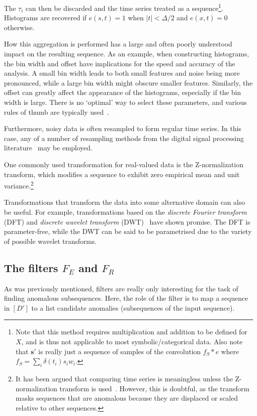 The $\tau_i$ can then be discarded and the time series treated as a sequence\footnote{Note that this method requires multiplication and addition to be defined for $X$, and is thus not applicable to most symbolic/categorical data. Also note that $\mathbf{s}'$ is really just a sequence of samples of the convolution $f_S \ast e$ where $f_S = \sum_i \delta(t_i) s_i w_i$.}. Histograms are recovered if $e(s, t) = 1$ when $|t| < \Delta/2$ and $e(x, t) = 0$ otherwise.

How this aggregation is performed has a large and often poorly understood impact on the resulting sequence. As an example, when constructing histograms, the bin width and offset have implications for the speed and accuracy of the analysis. A small bin width leads to both small features and noise being more pronounced, while a large bin width might obscure smaller features. Similarly, the offset can greatly affect the appearance of the histograms, especially if the bin width is large. There is no `optimal' way to select these parameters, and various rules of thumb are typically used~\cite{density_estimation}.

Furthermore, noisy data is often resampled to form regular time series. In this case, any of a number of resampling methods from the digital signal processing literature~\cite{TODO} may be employed.

One commonly used transformation for real-valued data is the Z-normalization transform, which modifies a sequence to exhibit zero empirical mean and unit variance.\footnote{It has been argued that comparing time series is meaningless unless the Z-normalization transform is used~\cite{keogh5}. However, this is doubtful, as the transform masks sequences that are anomalous because they are displaced or scaled relative to other sequences.}

Transformations that transform the data into some alternative domain can also be useful. For example, transformations based on the \emph{discrete Fourier transform} (DFT) and \emph{discrete wavelet transform} (DWT)~\cite{fu} have shown promise. The DFT is parameter-free, while the DWT can be said to be parametrised due to the variety of possible wavelet transforms.

\subsection{The filters $F_E$ and $F_R$}

As was previously mentioned, filters are really only interesting for the task of finding anomalous subsequences. Here, the role of the filter is to map a sequence in $[D']$ to a list candidate anomalies (subsequences of the input sequence).

